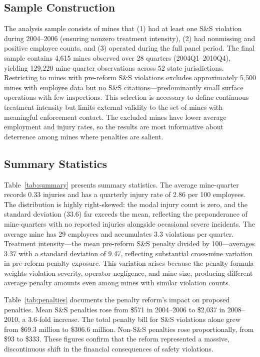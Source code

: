 \documentclass[12pt]{article}
\begin{document}
\subsection{Sample Construction}

The analysis sample consists of mines that (1) had at least one S\&S violation during 2004--2006 (ensuring nonzero treatment intensity), (2) had nonmissing and positive employee counts, and (3) operated during the full panel period. The final sample contains 4,615 mines observed over 28 quarters (2004Q1--2010Q4), yielding 129,220 mine-quarter observations across 52 state jurisdictions. Restricting to mines with pre-reform S\&S violations excludes approximately 5,500 mines with employee data but no S\&S citations---predominantly small surface operations with few inspections. This selection is necessary to define continuous treatment intensity but limits external validity to the set of mines with meaningful enforcement contact. The excluded mines have lower average employment and injury rates, so the results are most informative about deterrence among mines where penalties are salient.

\subsection{Summary Statistics}



Table~\ref{tab:summary} presents summary statistics. The average mine-quarter records 0.33 injuries and has a quarterly injury rate of 2.86 per 100 employees. The distribution is highly right-skewed: the modal injury count is zero, and the standard deviation (33.6) far exceeds the mean, reflecting the preponderance of mine-quarters with no reported injuries alongside occasional severe incidents. The average mine has 29 employees and accumulates 3.3 violations per quarter. Treatment intensity---the mean pre-reform S\&S penalty divided by 100---averages 3.37 with a standard deviation of 9.47, reflecting substantial cross-mine variation in pre-reform penalty exposure. This variation arises because the penalty formula weights violation severity, operator negligence, and mine size, producing different average penalty amounts even among mines with similar violation counts.



Table~\ref{tab:penalties} documents the penalty reform's impact on proposed penalties. Mean S\&S penalties rose from \$571 in 2004--2006 to \$2,037 in 2008--2010, a 3.6-fold increase. The total penalty bill for S\&S violations alone grew from \$69.3 million to \$306.6 million. Non-S\&S penalties rose proportionally, from \$93 to \$333. These figures confirm that the reform represented a massive, discontinuous shift in the financial consequences of safety violations.
\end{document}
